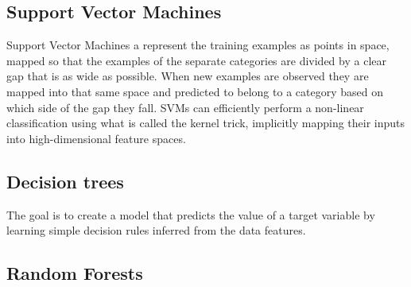 \documentclass[withindex,glossary]{cam-thesis}
\begin{document}
\subsection{Support Vector Machines}
Support Vector Machines a represent the training examples as points in space, mapped so that the examples of the separate categories are divided by a clear gap that is as wide as possible. When new examples are observed they are mapped into that same space and predicted to belong to a category based on which side of the gap they fall. SVMs can efficiently perform a non-linear classification using what is called the kernel trick, implicitly mapping their inputs into high-dimensional feature spaces.


\subsection{Decision trees}
The goal is to create a model that predicts the value of a target variable by learning simple decision rules inferred from the data features.


\subsection{Random Forests}


\cleardoublepage
{}
{}






\appendix



\printthesisindex
\end{document}
